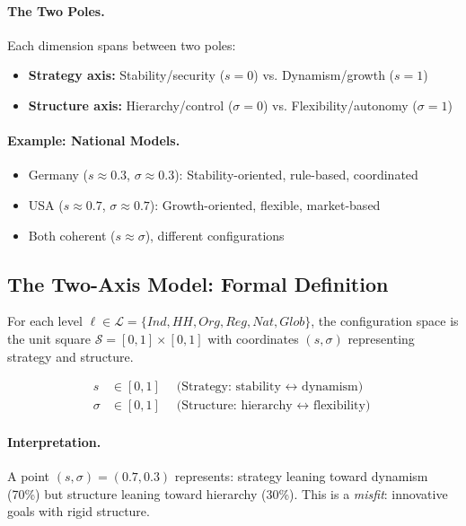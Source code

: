\paragraph{The Two Poles.}
Each dimension spans between two poles:
\begin{itemize}
  \item \textbf{Strategy axis:} Stability/security ($s = 0$) vs. Dynamism/growth ($s = 1$)
  \item \textbf{Structure axis:} Hierarchy/control ($\sigma = 0$) vs. Flexibility/autonomy ($\sigma = 1$)
\end{itemize}

\paragraph{Example: National Models.}
\begin{itemize}
  \item Germany ($s \approx 0.3$, $\sigma \approx 0.3$): Stability-oriented, rule-based, coordinated
  \item USA ($s \approx 0.7$, $\sigma \approx 0.7$): Growth-oriented, flexible, market-based
  \item Both coherent ($s \approx \sigma$), different configurations
\end{itemize}

\subsection{The Two-Axis Model: Formal Definition}

\begin{definition}
For each level $\ell \in \mathcal{L} = \{Ind, HH, Org, Reg, Nat, Glob\}$,
the configuration space is the unit square $\mathcal{S} = [0,1] \times [0,1]$
with coordinates $(s, \sigma)$ representing strategy and structure.
\end{definition}

\begin{definition}
\begin{align}
  s &\in [0,1] \quad \text{(Strategy: stability $\leftrightarrow$ dynamism)} \\
  \sigma &\in [0,1] \quad \text{(Structure: hierarchy $\leftrightarrow$ flexibility)}
\end{align}
\end{definition}

\paragraph{Interpretation.}
A point $(s, \sigma) = (0.7, 0.3)$ represents:
strategy leaning toward dynamism (70\%) but structure leaning toward hierarchy (30\%).
This is a \emph{misfit}: innovative goals with rigid structure.

